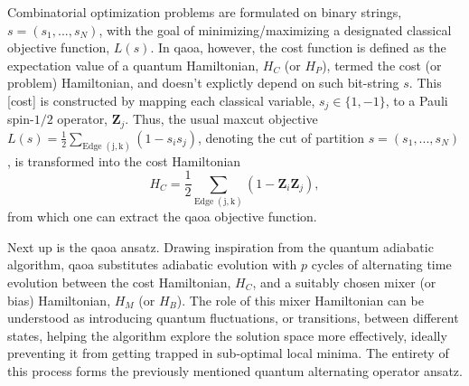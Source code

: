 Combinatorial optimization problems are formulated on binary strings, $s = (s_1,...,s_N)$, with the goal of minimizing/maximizing a designated classical objective function, $L(s)$. In \acrshort{qaoa}, however, the cost function is defined as the expectation value of a quantum Hamiltonian, $H_C$ (or $H_P$), termed the cost (or problem) Hamiltonian, and doesn't explictly depend on such bit-string $s$. This [cost] is constructed by mapping each classical variable, $s_j \in \{1, -1\}$, to a Pauli spin-$1/2$ operator, $\boldsymbol{Z}_j$. Thus, the usual \acrshort{maxcut} objective $L(s) = \frac{1}{2}\sum_{\mathrm{Edge}\;(\mathrm{j,k})}(1-s_{i}s_{j})$, denoting the cut of partition $s = (s_1,...,s_N)$, is transformed into the cost Hamiltonian
\begin{equation}\label{eq:H_C}
  H_C = \frac{1}{2}\sum_{\mathrm{Edge}\;(\mathrm{j,k})}(1-\boldsymbol{Z}_i\boldsymbol{Z}_j),
\end{equation}
from which one can extract the \acrshort{qaoa} objective function.

Next up is the \acrshort{qaoa} ansatz. Drawing inspiration from the quantum adiabatic algorithm, \acrshort{qaoa} substitutes adiabatic evolution with $p$ cycles of alternating time evolution between the cost Hamiltonian, $H_C$, and a suitably chosen mixer (or bias) Hamiltonian, $H_M$ (or $H_B$). The role of this mixer Hamiltonian can be understood as introducing quantum fluctuations, or transitions, between different states, helping the algorithm explore the solution space more effectively, ideally preventing it from getting trapped in sub-optimal local minima. The entirety of this process forms the previously mentioned quantum alternating operator ansatz.

